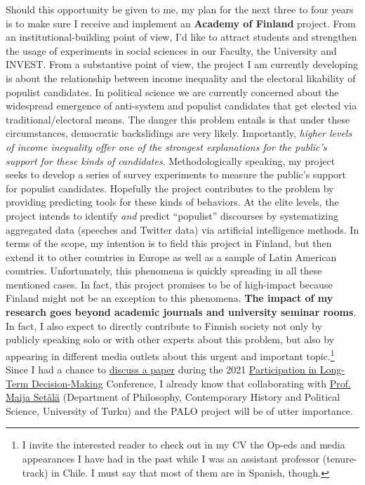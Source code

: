 \documentclass[10pt,stdletter,dateno,sigleft]{newlfm} %
\begin{document}
\begin{newlfm}
Should this opportunity be given to me, my plan for the next three to four years is to make sure I receive and implement an {\bf Academy of Finland} project. From an institutional-building point of view, I'd like to attract students and strengthen the usage of experiments in social sciences in our Faculty, the University and INVEST. From a substantive point of view, the project I am currently developing is about the relationship between income inequality and the electoral likability of populist candidates. In political science we are currently concerned about the widespread emergence of anti-system and populist candidates that get elected via traditional/electoral means. The danger this problem entails is that under these circumstances, democratic backslidings are very likely. Importantly, \emph{higher levels of income inequality offer one of the strongest explanations for the public's support for these kinds of candidates}. Methodologically speaking, my project seeks to develop a series of survey experiments to measure the public's support for populist candidates. Hopefully the project contributes to the problem by providing predicting tools for these kinds of behaviors. At the elite levels, the project intends to identify \emph{and} predict ``populist'' discourses by systematizing aggregated data (speeches and Twitter data) via artificial intelligence methods. In terms of the scope, my intention is to field this project in Finland, but then extend it to other countries in Europe as well as a sample of Latin American countries. Unfortunately, this phenomena is quickly spreading in all these mentioned cases. In fact, this project promises to be of high-impact because Finland might not be an exception to this phenomena. {\bf The impact of my research goes beyond academic journals and university seminar rooms}. In fact, I also expect to directly contribute to Finnish society not only by publicly speaking solo or with other experts about this problem, but also by appearing in different media outlets about this urgent and important topic.\footnote{I invite the interested reader to check out in my CV the Op-eds and media appearances I have had in the past while I was an assistant professor (tenure-track) in Chile. I must say that most of them are in Spanish, though.} Since I had a chance to \href{https://paloresearch.fi/en/events/}{discuss a paper} during the 2021 \href{https://paloresearch.fi/en/}{Participation in Long-Term Decision-Making} Conference, I already know that collaborating with \href{https://www.utu.fi/en/people/maija-setala}{Prof. Maija Set{\"a}l{\"a}} (Department of Philosophy, Contemporary History and Political Science, University of Turku) and the PALO project will be of utter importance. 


\end{newlfm}
\end{document}
